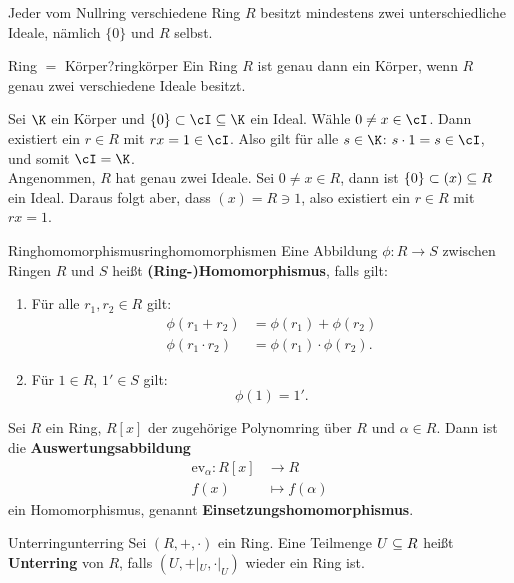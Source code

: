 \begin{bemerkung}
Jeder vom Nullring verschiedene Ring $R$ besitzt mindestens zwei unterschiedliche Ideale, nämlich $\{0\}$ und $R$ selbst.
\end{bemerkung}
\begin{satz}{Ring $=$ Körper?}{ringkörper}
Ein Ring $R$ ist genau dann ein Körper, wenn $R$ genau zwei verschiedene Ideale besitzt.
\end{satz}
\begin{beweis}
Sei $\K$ ein Körper und $\{0\} \subset \cI \sub \K$ ein Ideal. Wähle $0 \neq x \in \cI$. Dann existiert ein $r \in R$ mit $rx = 1 \in \cI$. Also gilt für alle $s \in \K$: $s \cdot 1 = s \in \cI$, und somit $\cI = \K$.\\
Angenommen, $R$ hat genau zwei Ideale. Sei $0 \neq x \in R$, dann ist $\{0\} \subset (x) \subseteq R$ ein Ideal. Daraus folgt aber, dass $(x)=R \ni 1$, also existiert ein $r \in R$ mit $rx = 1$.
\end{beweis}
\begin{definition}{Ringhomomorphismus}{ringhomomorphismen}
Eine Abbildung $\phi: R \to S$ zwischen Ringen $R$ und $S$ heißt \textbf{(Ring-)Homomorphismus}, falls gilt:
\begin{enumerate}[({H}1)]
\item Für alle $r_1, r_2 \in R$ gilt:
\begin{align}
\phi(r_1+r_2) &= \phi(r_1)+\phi(r_2)\\
\phi(r_1 \cdot r_2) &= \phi(r_1) \cdot \phi(r_2).
\end{align}
\item Für $1 \in R$, $1' \in S$ gilt:
\begin{equation}
\phi(1) = 1'.
\end{equation}
\end{enumerate}
\end{definition}
\begin{beispiel}
Sei $R$ ein Ring, $R[x]$ der zugehörige Polynomring über $R$ und $\alpha \in R$. Dann ist die \textbf{Auswertungsabbildung}
\begin{equation}
\begin{split}
\text{ev}_\alpha: R[x] &\to R\\
f(x) &\mapsto f(\alpha)
\end{split}
\end{equation}
ein Homomorphismus, genannt \textbf{Einsetzungshomomorphismus}.
\end{beispiel}
\begin{definition}{Unterring}{unterring}
Sei $(R,+,\cdot)$ ein Ring. Eine Teilmenge $U \subseteq R$ heißt \textbf{Unterring} von $R$, falls $(U, +|_U, \cdot|_U)$ wieder ein Ring ist.
\end{definition}
